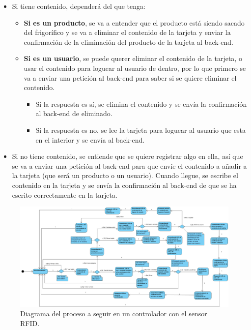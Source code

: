 \begin{itemize}
    \item Si tiene contenido, dependerá del que tenga:
    \begin{itemize}
        \item \textbf{Si es un producto}, se va a entender que el producto está siendo sacado del frigorífico y se va a eliminar el contenido de la tarjeta y enviar la confirmación de la eliminación del producto de la tarjeta al back-end.
        \item \textbf{Si es un usuario}, se puede querer eliminar el contenido de la tarjeta, o usar el contenido para loguear al usuario de dentro, por lo que primero se va a enviar una petición al back-end para saber si se quiere eliminar el contenido. 
        \begin{itemize}
            \item Si la respuesta es sí, se elimina el contenido y se envía la confirmación al back-end de eliminado.
            \item Si la respuesta es no, se lee la tarjeta para loguear al usuario que esta en el interior y se envía al back-end.
        \end{itemize}
    \end{itemize}
    \item Si no tiene contenido, se entiende que se quiere registrar algo en ella, así que se va a enviar una petición al back-end para que envíe el contenido a añadir a la tarjeta (que será un producto o un usuario). Cuando llegue, se escribe el contenido en la tarjeta y se envía la confirmación al back-end de que se ha escrito correctamente en la tarjeta.
\end{itemize}

\begin{landscape}
    \vspace*{7em}
\begin{figure}[h]
    \centering\includegraphics[width=\hsize]{capitulos/capitulo6/diagramaRFID.png}
    \caption{Diagrama del proceso a seguir en un controlador con el sensor RFID.}
    \label{img_gantt}
\end{figure}

\end{landscape}

